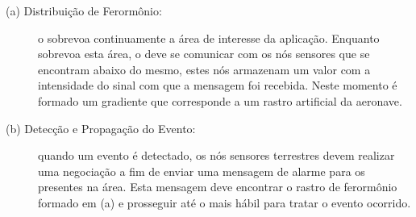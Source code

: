 \begin{description}

	\item[ (a) Distribuição de Ferormônio: ] o \vant sobrevoa continuamente
a área de interesse da aplicação. Enquanto sobrevoa esta área, o \vant deve se
comunicar com os nós sensores que se encontram abaixo do mesmo, estes nós
armazenam um valor com a intensidade do sinal com que a mensagem foi recebida.
Neste momento é formado um gradiente que corresponde a um rastro artificial da aeronave.

	\item[ (b) Detecção e Propagação do Evento:] quando um evento é
detectado, os nós sensores terrestres devem realizar uma negociação a fim de
enviar uma mensagem de alarme para os \vants presentes na área. Esta mensagem
deve encontrar o rastro de ferormônio formado em (a) e prosseguir até o \vant
mais hábil para tratar o evento ocorrido.





\end{description}

